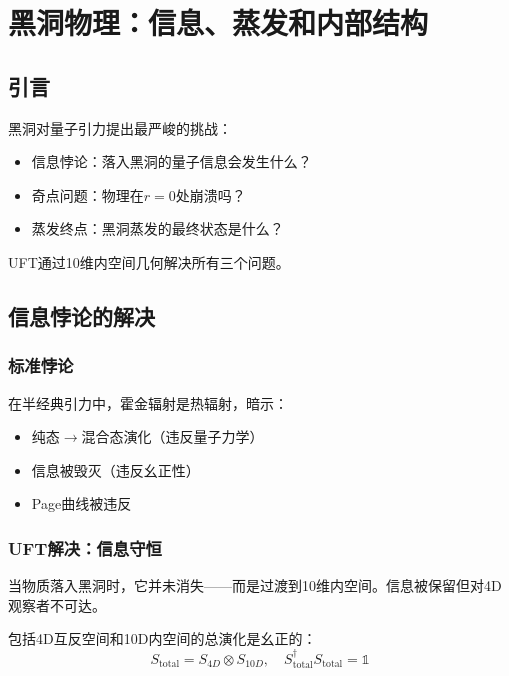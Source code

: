 \section{黑洞物理：信息、蒸发和内部结构}
\label{sec:bh_physics_complete}

\subsection{引言}

黑洞对量子引力提出最严峻的挑战：
\begin{itemize}
    \item 信息悖论：落入黑洞的量子信息会发生什么？
    \item 奇点问题：物理在$r = 0$处崩溃吗？
    \item 蒸发终点：黑洞蒸发的最终状态是什么？
\end{itemize}

UFT通过10维内空间几何解决所有三个问题。

\subsection{信息悖论的解决}

\subsubsection{标准悖论}

在半经典引力中，霍金辐射是热辐射，暗示：
\begin{itemize}
    \item 纯态$\to$混合态演化（违反量子力学）
    \item 信息被毁灭（违反幺正性）
    \item Page曲线被违反
\end{itemize}

\subsubsection{UFT解决：信息守恒}

\begin{insight}[信息流向内空间]
当物质落入黑洞时，它并未消失——而是过渡到10维内空间。信息被保留但对4D观察者不可达。
\end{insight}

\begin{theorem}[UFT中的幺正演化]
包括4D互反空间和10D内空间的总演化是幺正的：
\begin{equation}
    S_{\text{total}} = S_{4D} \otimes S_{10D}, \quad S_{\text{total}}^\dagger S_{\text{total}} = \mathbb{1}
\end{equation}
\end{theorem}

